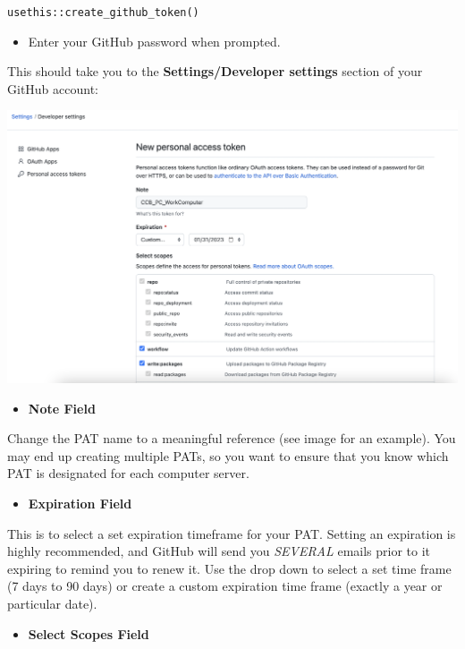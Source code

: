 \documentclass[
]{book}
\providecommand{\tightlist}{%
  \setlength{\itemsep}{0pt}\setlength{\parskip}{0pt}}
\begin{document}
\texttt{usethis::create\_github\_token()}

\begin{itemize}
\tightlist
\item
  Enter your GitHub password when prompted.
\end{itemize}

This should take you to the \textbf{Settings/Developer settings} section of your GitHub account:

\begin{flushleft}\includegraphics[width=32.22in]{images/pat} \end{flushleft}

\begin{itemize}
\tightlist
\item
  \textbf{Note Field}
\end{itemize}

Change the PAT name to a meaningful reference (see image for an example). You may end up creating multiple PATs, so you want to ensure that you know which PAT is designated for each computer \textbar{} server.

\begin{itemize}
\tightlist
\item
  \textbf{Expiration Field}
\end{itemize}

This is to select a set expiration timeframe for your PAT. Setting an expiration is highly recommended, and GitHub will send you \emph{SEVERAL} emails prior to it expiring to remind you to renew it. Use the drop down to select a set time frame (7 days to 90 days) or create a custom expiration time frame (exactly a year or particular date).

\begin{itemize}
\tightlist
\item
  \textbf{Select Scopes Field}
\end{itemize}
\end{document}
